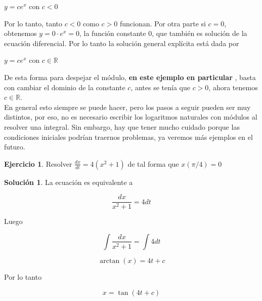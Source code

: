 \documentclass{article}
\theoremstyle{plain}
\theoremstyle{definition}
\newtheorem{ejer}[thm]{Ejercicio}
\newtheorem{sol}[thm]{Solución}
\begin{document}
\begin{center}
$y=ce^x$ con $c<0$
\end{center}



Por lo tanto, tanto $c<0$ como $c>0$ funcionan. Por otra parte si $c=0$, obtenemos $y= 0\cdot e^x=0$, la función constante $0$, que también es solución de la ecuación diferencial.  Por lo tanto la solución general explícita está dada por

\begin{center}
$y=ce^x$  con $c \in \mathbb{R}$
\end{center}

De esta forma para despejar el módulo, \textbf{en este ejemplo en particular }, basta con cambiar el dominio de la constante $c$, antes se tenía que $c>0$, ahora tenemos $c \in \mathbb{R}$. \\

En general esto siempre se puede hacer, pero los pasos a seguir pueden ser muy distintos, por eso, no es necesario escribir los logaritmos naturales con módulos al resolver una integral. Sin embargo, hay que tener mucho cuidado porque las condiciones iniciales podrían traernos problemas, ya veremos más ejemplos en el futuro.\\

\newpage

\begin{ejer}Resolver $\displaystyle \frac{dx}{dt} = 4(x^2+1)$ de tal forma que $x(\pi/4)=0$\\
\end{ejer}

\begin{sol}La ecuación es equivalente a
\end{sol}

\begin{center}
$$\displaystyle \frac{dx}{x^2+1} = 4dt$$
\end{center}

Luego

\begin{center}
$$\displaystyle \int \frac{dx}{x^2+1} = \int 4dt$$
\end{center}


\begin{center}
$$\arctan (x) = 4t +c$$
\end{center}

Por lo tanto

\begin{center}
$$x = \tan(4t +c)$$
\end{center}
\end{document}
